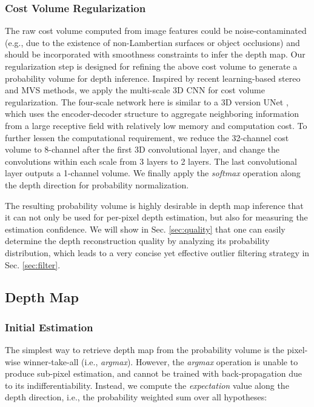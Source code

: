 \documentclass[runningheads]{llncs}
\begin{document}
\vspace{-3mm}
\subsubsection{Cost Volume Regularization} The raw cost volume computed from image features could be noise-contaminated (e.g., due to the existence of non-Lambertian surfaces or object occlusions) and should be incorporated with smoothness constraints to infer the depth map. Our regularization step is designed for refining the above cost volume  to generate a probability volume  for depth inference. Inspired by recent learning-based stereo \cite{kendall2017end} and MVS \cite{ji2017surfacenet,kar2017learning} methods, we apply the multi-scale 3D CNN for cost volume regularization. The four-scale network here is similar to a 3D version UNet \cite{ronneberger2015u}, which uses the encoder-decoder structure to aggregate neighboring information from a large receptive field with relatively low memory and computation cost. To further lessen the computational requirement, we reduce the 32-channel cost volume to 8-channel after the first 3D convolutional layer, and change the convolutions within each scale from 3 layers to 2 layers. The last convolutional layer outputs a 1-channel volume. We finally apply the \textit{softmax} operation along the depth direction for probability normalization. 
	
The resulting probability volume is highly desirable in depth map inference that it can not only be used for per-pixel depth estimation, but also for measuring the estimation confidence. We will show in Sec. \ref{sec:quality} that one can easily determine the depth reconstruction quality by analyzing its probability distribution, which leads to a very concise yet effective outlier filtering strategy in Sec. \ref{sec:filter}.


\subsection{Depth Map}

\subsubsection{Initial Estimation} The simplest way to retrieve depth map  from the probability volume  is the pixel-wise winner-take-all \cite{collins1996space} (i.e., \textit{argmax}). 
However, the \textit{argmax} operation is unable to produce sub-pixel estimation, and cannot be trained with back-propagation due to its indifferentiability. Instead, we compute the \emph{expectation} value along the depth direction, i.e., the probability weighted sum over all hypotheses: 
	
\end{document}
